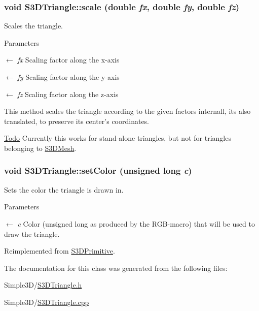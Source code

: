 \hypertarget{class_s3_d_triangle_a0808a047e513fb2322e3fc6465c7c011}{
\subsubsection[{scale}]{\setlength{\rightskip}{0pt plus 5cm}void S3DTriangle::scale (double {\em fx}, \/  double {\em fy}, \/  double {\em fz})}}
\label{class_s3_d_triangle_a0808a047e513fb2322e3fc6465c7c011}


Scales the triangle. 


\begin{DoxyParams}{Parameters}
\item[\mbox{$\leftarrow$} {\em fx}]Scaling factor along the x-\/axis \item[\mbox{$\leftarrow$} {\em fy}]Scaling factor along the y-\/axis \item[\mbox{$\leftarrow$} {\em fz}]Scaling factor along the z-\/axis\end{DoxyParams}
This method scales the triangle according to the given factors internall, its also translated, to preserve its center's coordinates. \begin{Desc}
\item[\hyperlink{todo__todo000002}{Todo}]Currently this works for stand-\/alone triangles, but not for triangles belonging to \hyperlink{class_s3_d_mesh}{S3DMesh}. \end{Desc}
\hypertarget{class_s3_d_triangle_a2c60503c3bae194ec8247a0e2467c915}{
\subsubsection[{setColor}]{\setlength{\rightskip}{0pt plus 5cm}void S3DTriangle::setColor (unsigned long {\em c})}}
\label{class_s3_d_triangle_a2c60503c3bae194ec8247a0e2467c915}


Sets the color the triangle is drawn in. 


\begin{DoxyParams}{Parameters}
\item[\mbox{$\leftarrow$} {\em c}]Color (unsigned long as produced by the RGB-\/macro) that will be used to draw the triangle. \end{DoxyParams}


Reimplemented from \hyperlink{class_s3_d_primitive_a1c8f036193987522bdfb6a49b9b74000}{S3DPrimitive}.



The documentation for this class was generated from the following files:\begin{DoxyCompactItemize}
\item 
Simple3D/\hyperlink{_s3_d_triangle_8h}{S3DTriangle.h}\item 
Simple3D/\hyperlink{_s3_d_triangle_8cpp}{S3DTriangle.cpp}\end{DoxyCompactItemize}
